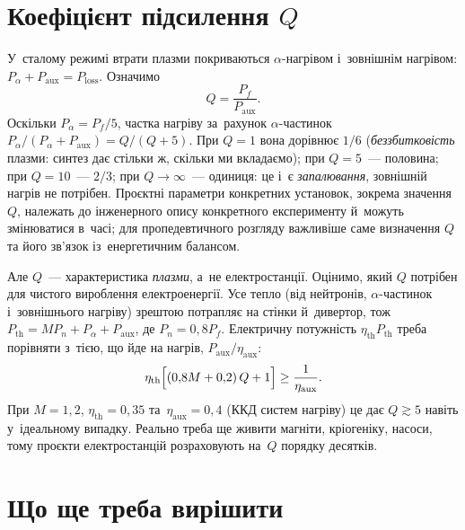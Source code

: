 \section{Коефіцієнт підсилення \texorpdfstring{$Q$}{Q}}



У~сталому режимі втрати плазми покриваються $\alpha$-нагрівом і~зовнішнім нагрівом:
$P_\alpha+P_{\mathrm{aux}}=P_{\mathrm{loss}}$. Означимо
\begin{equation*}
	Q=\frac{P_f}{P_{\mathrm{aux}}}.
\end{equation*}
Оскільки $P_\alpha=P_f/5$, частка нагріву за~рахунок $\alpha$-частинок
$P_\alpha/(P_\alpha+P_{\mathrm{aux}})=Q/(Q+5)$. При $Q=1$ вона дорівнює $1/6$
(\emph{беззбитковість} плазми: синтез дає стільки ж, скільки ми вкладаємо); при $Q=5$~---
половина; при $Q=10$~--- $2/3$; при $Q\to\infty$~--- одиниця: це і~є \emph{запалювання},
зовнішній нагрів не потрібен. Проєктні параметри конкретних установок, зокрема значення
$Q$, належать до інженерного опису конкретного експерименту й~можуть змінюватися в~часі;
для пропедевтичного розгляду важливіше саме визначення $Q$ та його зв'язок із~енергетичним
балансом.

Але $Q$~--- характеристика \emph{плазми}, а~не електростанції. Оцінимо, який $Q$ потрібен
для чистого вироблення електроенергії. Усе тепло (від нейтронів, $\alpha$-частинок
і~зовнішнього нагріву) зрештою потрапляє на стінки й~дивертор, тож
$P_{\mathrm{th}}=MP_n+P_\alpha+P_{\mathrm{aux}}$, де $P_n=0{,}8P_f$. Електричну потужність
$\eta_{\mathrm{th}}P_{\mathrm{th}}$ треба порівняти з~тією, що йде на нагрів,
$P_{\mathrm{aux}}/\eta_{\mathrm{aux}}$:
\begin{equation*}
	\eta_{\mathrm{th}}\Bigl[(0{,}8M+0{,}2)\,Q+1\Bigr]\geq\frac1{\eta_{\mathrm{aux}}}.
\end{equation*}
При $M=1{,}2$, $\eta_{\mathrm{th}}=0{,}35$ та~$\eta_{\mathrm{aux}}=0{,}4$ (ККД систем
нагріву) це дає $Q\gtrsim5$ навіть у~ідеальному випадку. Реально треба ще живити магніти,
кріогеніку, насоси, тому проєкти електростанцій розраховують на~$Q$ порядку десятків.



\section{Що ще треба вирішити}



